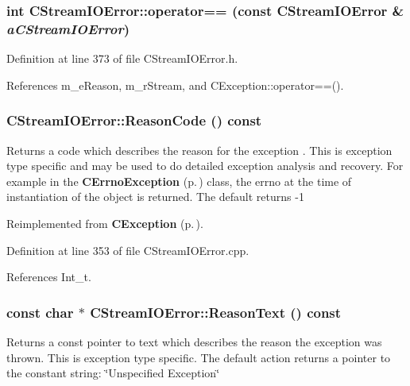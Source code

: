 \subsubsection{\setlength{\rightskip}{0pt plus 5cm}int CStream\-IOError::operator== (const CStream\-IOError \& {\em a\-CStream\-IOError})\hspace{0.3cm}{\tt  [inline]}}\label{classCStreamIOError_a4}




Definition at line 373 of file CStream\-IOError.h.

References m\_\-e\-Reason, m\_\-r\-Stream, and CException::operator==().
\subsubsection{ CStream\-IOError::Reason\-Code () const\hspace{0.3cm}{\tt  [virtual]}}\label{classCStreamIOError_a9}


Returns a code which describes the reason for the exception . This is exception type specific and may be used to do detailed exception analysis and recovery. For example in the {\bf CErrno\-Exception} {\rm (p.\,\pageref{classCErrnoException})} class, the errno at the time of instantiation of the object is returned. The default returns -1 

Reimplemented from {\bf CException} {\rm (p.\,\pageref{classCException_a9})}.

Definition at line 353 of file CStream\-IOError.cpp.

References Int\_\-t.
\subsubsection{\setlength{\rightskip}{0pt plus 5cm}const char $\ast$ CStream\-IOError::Reason\-Text () const\hspace{0.3cm}{\tt  [virtual]}}\label{classCStreamIOError_a8}


Returns a const pointer to text which describes the reason the exception was thrown. This is exception type specific. The default action returns a pointer to the constant string: \char`\"{}Unspecified Exception\char`\"{} 

